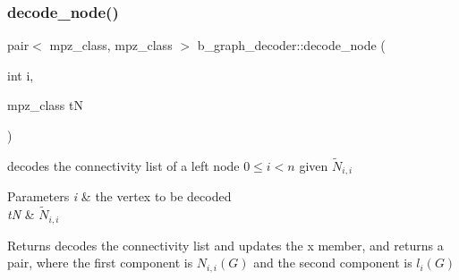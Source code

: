 \subsubsection{\texorpdfstring{decode\+\_\+node()}{decode\_node()}}
{\footnotesize\ttfamily pair$<$ mpz\+\_\+class, mpz\+\_\+class $>$ b\+\_\+graph\+\_\+decoder\+::decode\+\_\+node (\begin{DoxyParamCaption}\item[{int}]{i,  }\item[{mpz\+\_\+class}]{tN }\end{DoxyParamCaption})}



decodes the connectivity list of a left node $0 \leq i < n$ given $\tilde{N}_{i,i}$ 


\begin{DoxyParams}{Parameters}
{\em i} & the vertex to be decoded \\
\hline
{\em tN} & $\tilde{N}_{i,i}$ \\
\hline
\end{DoxyParams}
\begin{DoxyReturn}{Returns}
decodes the connectivity list and updates the x member, and returns a pair, where the first component is $N_{i,i}(G)$ and the second component is $l_{i}(G)$ 
\end{DoxyReturn}

